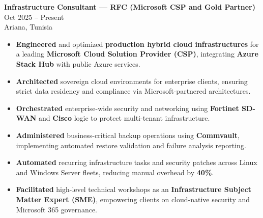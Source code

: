 \documentclass[10pt, letterpaper]{article}
\newenvironment{highlights}{
\begin{itemize}[leftmargin=12pt, itemsep=2pt]
}{
\end{itemize}
}
\begin{document}
\textbf{Infrastructure Consultant --- RFC (Microsoft CSP and Gold Partner)} \hfill Oct 2025 -- Present \\
Ariana, Tunisia
\begin{highlights}
\item \textbf{Engineered} and optimized \textbf{production hybrid cloud infrastructures} for a leading \textbf{Microsoft Cloud Solution Provider (CSP)}, integrating \textbf{Azure Stack Hub} with public Azure services.
\item \textbf{Architected} sovereign cloud environments for enterprise clients, ensuring strict data residency and compliance via Microsoft-partnered architectures.
\item \textbf{Orchestrated} enterprise-wide security and networking using \textbf{Fortinet SD-WAN} and \textbf{Cisco} logic to protect multi-tenant infrastructure.
\item \textbf{Administered} business-critical backup operations using \textbf{Commvault}, implementing automated restore validation and failure analysis reporting.
\item \textbf{Automated} recurring infrastructure tasks and security patches across Linux and Windows Server fleets, reducing manual overhead by \textbf{40\%}.
\item \textbf{Facilitated} high-level technical workshops as an \textbf{Infrastructure Subject Matter Expert (SME)}, empowering clients on cloud-native security and Microsoft 365 governance.
\end{highlights}
\end{document}
